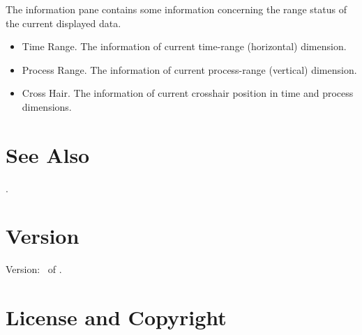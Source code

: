 \documentclass[english]{article}
\begin{document}
The information pane contains some information concerning the range status of the current displayed data.
\begin{itemize}
 \item Time Range. The information of current time-range (horizontal) dimension. 
 \item Process Range. The information of current process-range (vertical) dimension. 
 \item Cross Hair. The information of current crosshair position in time and process dimensions. 
\end{itemize}







\section{See Also}

.

\section{Version}

Version: \Version\ of \Date.

\section{License and Copyright}
\end{document}
